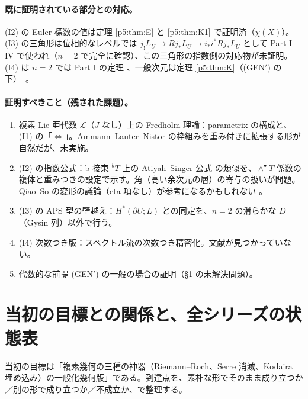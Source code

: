 \paragraph{既に証明されている部分との対応。}(I2) の Euler 標数の値は定理 \ref{p5:thm:E} と \ref{p5:thm:K1} で証明済（$\chi(X)$）。(I3) の三角形は位相的なレベルでは $j_!L_U\to Rj_*L_U\to i_*i^*Rj_*L_U$ として Part I--IV で使われ（$n=2$ で完全に確認）、この三角形の指数側の対応物が未証明。(I4) は $n=2$ では Part I の定理 \tP、一般次元は定理 \ref{p5:thm:K}（(GEN$'$) の下）\tP\ \tQ。

\paragraph{証明すべきこと（残された課題）。}
\begin{enumerate}
\item 複素 Lie 亜代数 $\mathcal L$（$J$ なし）上の Fredholm 理論：parametrix の構成と、(I1) の「$\Leftrightarrow$」。Ammann--Lauter--Nistor の枠組みを重み付きに拡張する形が自然だが、未実施。
\item (I2) の指数公式：b-接束 $^bT$ 上の Atiyah--Singer 公式 \cite{BLS} の類似を、$\wedge^\bullet T$ 係数の複体と重みつきの設定で示す。角（高い余次元の層）の寄与の扱いが問題。Qiao--So の変形の議論（eta 項なし）が参考になるかもしれない \tQ。
\item (I3) の APS 型の壁越え：$H^*(\partial U;L)$ との同定を、$n=2$ の滑らかな $D$（Gysin 列）以外で行う。
\item (I4) 次数つき版：スペクトル流の次数つき精密化。文献が見つかっていない。
\item 代数的な前提 (GEN$'$) の一般の場合の証明（\S\ref{p5:sec:ledger} の未解決問題）。
\end{enumerate}

\section{当初の目標との関係と、全シリーズの状態表}\label{p5:sec:ledger}
当初の目標は「複素幾何の三種の神器（Riemann--Roch、Serre 消滅、Kodaira 埋め込み）の一般化幾何版」である。到達点を、素朴な形でそのまま成り立つか／別の形で成り立つか／不成立か、で整理する。

